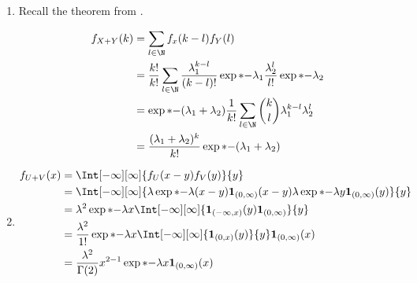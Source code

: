 
\begin{solution}

\phantom{}

\begin{enumerate}

    \item Recall the theorem from \cite[Lecture 3, Slide 35]{EStat}.
    
    \begin{align*}
        f_{X + Y}(k)
        & =
        \sum_{l \in \N}
            f_x(k - l) f_Y(l) \\
        & =
        \frac{k!}{k!}
        \sum_{l \in \N}
            \frac{\lambda_1^{k - l}}{(k - l)!}
            \exp*{-\lambda_1}
            \frac{\lambda_2^l}{l!}
            \exp*{-\lambda_2} \\
        & =
        \exp*{-(\lambda_1 + \lambda_2)}
        \frac{1}{k!}
        \sum_{l \in \N}
            \binom{k}{l}
            \lambda_1^{k - l}
            \lambda_2^l \\
        & =
        \frac{(\lambda_1 + \lambda_2)^k}{k!}
        \exp*{-(\lambda_1 + \lambda_2)}
    \end{align*}

    \item

    \begin{align*}
        f_{U + V}(x)
        & =
        \Int[-\infty][\infty]
        {
            f_U(x - y) f_V(y)
        }{y} \\
        & =
        \Int[-\infty][\infty]
        {
            \lambda
            \exp*{-\lambda (x - y)}
            \mathbf 1_{(0, \infty)}(x - y)
            \lambda
            \exp*{-\lambda y}
            \mathbf 1_{(0, \infty)}(y)
        }{y} \\
        & =
        \lambda^2
        \exp*{-\lambda x}
        \Int[-\infty][\infty]
        {
            \mathbf 1_{(-\infty, x)}(y)
            \mathbf 1_{(0, \infty)}
        }{y} \\
        & =
        \frac{\lambda^2}{1!}
        \exp*{-\lambda x}
        \Int[-\infty][\infty]
        {
            \mathbf 1_{(0, x)}(y)
        }{y}
        \mathbf 1_{(0, \infty)}(x) \\
        & =
        \frac{\lambda^2}{\Gamma(2)}
        x^{2 - 1}
        \exp*{-\lambda x}
        \mathbf 1_{(0, \infty)}(x)
    \end{align*}


\end{enumerate}
\end{solution}

